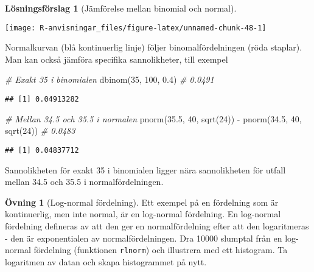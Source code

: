 \documentclass[
]{book}
\newenvironment{Shaded}{\begin{snugshade}}{\end{snugshade}}
\newcommand{\CommentTok}[1]{\textcolor[rgb]{0.56,0.35,0.01}{\textit{#1}}}
\newcommand{\DecValTok}[1]{\textcolor[rgb]{0.00,0.00,0.81}{#1}}
\newcommand{\FloatTok}[1]{\textcolor[rgb]{0.00,0.00,0.81}{#1}}
\newcommand{\FunctionTok}[1]{\textcolor[rgb]{0.00,0.00,0.00}{#1}}
\newcommand{\NormalTok}[1]{#1}
\newcommand{\SpecialCharTok}[1]{\textcolor[rgb]{0.00,0.00,0.00}{#1}}
\theoremstyle{definition}
\theoremstyle{definition}
\theoremstyle{definition}
\newtheorem{exercise}{Övning}[chapter]
\theoremstyle{definition}
\newtheorem{hypothesis}{Lösningsförslag}[chapter]
\theoremstyle{remark}
\begin{document}
\begin{hypothesis}[Jämförelse mellan binomial och normal]
\begin{center}\texttt{[image: R-anvisningar\_files/figure-latex/unnamed-chunk-48-1]} \end{center}

Normalkurvan (blå kontinuerlig linje) följer binomalfördelningen (röda staplar). Man kan också jämföra specifika sannolikheter, till exempel

\begin{Shaded}
\begin{Highlighting}[]
\CommentTok{\# Exakt 35 i binomialen}
\FunctionTok{dbinom}\NormalTok{(}\DecValTok{35}\NormalTok{, }\DecValTok{100}\NormalTok{, }\FloatTok{0.4}\NormalTok{) }\CommentTok{\# 0.0491}
\end{Highlighting}
\end{Shaded}

\begin{verbatim}
## [1] 0.04913282
\end{verbatim}

\begin{Shaded}
\begin{Highlighting}[]
\CommentTok{\# Mellan 34.5 och 35.5 i normalen}
\FunctionTok{pnorm}\NormalTok{(}\FloatTok{35.5}\NormalTok{, }\DecValTok{40}\NormalTok{, }\FunctionTok{sqrt}\NormalTok{(}\DecValTok{24}\NormalTok{)) }\SpecialCharTok{{-}} \FunctionTok{pnorm}\NormalTok{(}\FloatTok{34.5}\NormalTok{, }\DecValTok{40}\NormalTok{, }\FunctionTok{sqrt}\NormalTok{(}\DecValTok{24}\NormalTok{)) }\CommentTok{\# 0.0483}
\end{Highlighting}
\end{Shaded}

\begin{verbatim}
## [1] 0.04837712
\end{verbatim}

Sannolikheten för exakt 35 i binomialen ligger nära sannolikheten för utfall mellan 34.5 och 35.5 i normalfördelningen.
\end{hypothesis}

\begin{exercise}[Log-normal fördelning]
Ett exempel på en fördelning som är kontinuerlig, men inte normal, är en log-normal fördelning. En log-normal fördelning defineras av att den ger en normalfördelning efter att den logaritmeras - den är exponentialen av normalfördelningen. Dra 10000 slumptal från en log-normal fördelning (funktionen \texttt{rlnorm}) och illustrera med ett histogram. Ta logaritmen av datan och skapa histogrammet på nytt.
\end{exercise}
\end{document}
